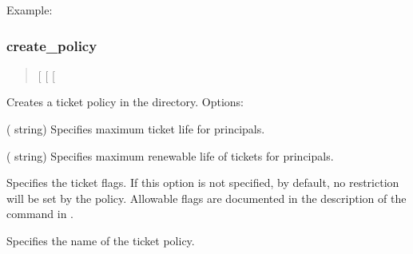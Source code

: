 \documentclass[letterpaper,10pt,english]{sphinxmanual}
\begin{document}
\sphinxAtStartPar
Example:

\begin{sphinxVerbatim}[commandchars=\\\{\}]
   
  
   
\end{sphinxVerbatim}


\subsubsection{create\_policy}
\label{\detokenize{admin/admin_commands/kdb5_ldap_util:create-policy}}\label{\detokenize{admin/admin_commands/kdb5_ldap_util:kdb5-ldap-util-stashsrvpw-end}}\label{\detokenize{admin/admin_commands/kdb5_ldap_util:kdb5-ldap-util-create-policy}}\begin{quote}

\sphinxAtStartPar
{}
{[} \sphinxstyleemphasis{max\_ticket\_life}{]}
{[} \sphinxstyleemphasis{max\_renewable\_ticket\_life}{]}
{[}\sphinxstyleemphasis{ticket\_flags}{]}
\end{quote}

\sphinxAtStartPar
Creates a ticket policy in the directory.  Options:
\begin{description}
\sphinxAtStartPar
( string) Specifies maximum ticket life for
principals.

\sphinxAtStartPar
( string) Specifies maximum renewable life of
tickets for principals.

\sphinxAtStartPar
Specifies the ticket flags.  If this option is not specified, by
default, no restriction will be set by the policy.  Allowable
flags are documented in the description of the 
command in {\hyperref[\detokenize{admin/admin_commands/kadmin_local:kadmin-1}]{}}.

\sphinxAtStartPar
Specifies the name of the ticket policy.

\end{description}
\end{document}
